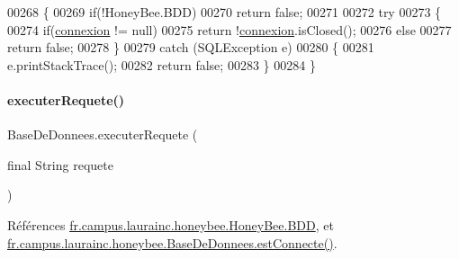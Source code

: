 \begin{DoxyCode}
00268     \{
00269         \textcolor{keywordflow}{if}(!HoneyBee.BDD)
00270             \textcolor{keywordflow}{return} \textcolor{keyword}{false};
00271 
00272         \textcolor{keywordflow}{try}
00273         \{
00274             \textcolor{keywordflow}{if}(\hyperlink{classfr_1_1campus_1_1laurainc_1_1honeybee_1_1_base_de_donnees_a358899633f17b8cd00dd2c4cfdd40abe}{connexion} != null)
00275                 \textcolor{keywordflow}{return} !\hyperlink{classfr_1_1campus_1_1laurainc_1_1honeybee_1_1_base_de_donnees_a358899633f17b8cd00dd2c4cfdd40abe}{connexion}.isClosed();
00276             \textcolor{keywordflow}{else}
00277                 \textcolor{keywordflow}{return} \textcolor{keyword}{false};
00278         \}
00279         \textcolor{keywordflow}{catch} (SQLException e)
00280         \{
00281             e.printStackTrace();
00282             \textcolor{keywordflow}{return} \textcolor{keyword}{false};
00283         \}
00284     \}
\end{DoxyCode}
\mbox{\label{classfr_1_1campus_1_1laurainc_1_1honeybee_1_1_base_de_donnees_a421bffe6f14c01bee64695e7b6a9745d}} 
\paragraph{\texorpdfstring{executer\+Requete()}{executerRequete()}}
{\footnotesize\ttfamily Base\+De\+Donnees.\+executer\+Requete (\begin{DoxyParamCaption}\item[{final String}]{requete }\end{DoxyParamCaption})}



Références \hyperlink{classfr_1_1campus_1_1laurainc_1_1honeybee_1_1_honey_bee_abfb4f6cc1c8bb793c37ccb8408abc51c}{fr.\+campus.\+laurainc.\+honeybee.\+Honey\+Bee.\+B\+DD}, et \hyperlink{classfr_1_1campus_1_1laurainc_1_1honeybee_1_1_base_de_donnees_a735f54c2c183a595c9a9a5ba947491f5}{fr.\+campus.\+laurainc.\+honeybee.\+Base\+De\+Donnees.\+est\+Connecte()}.



